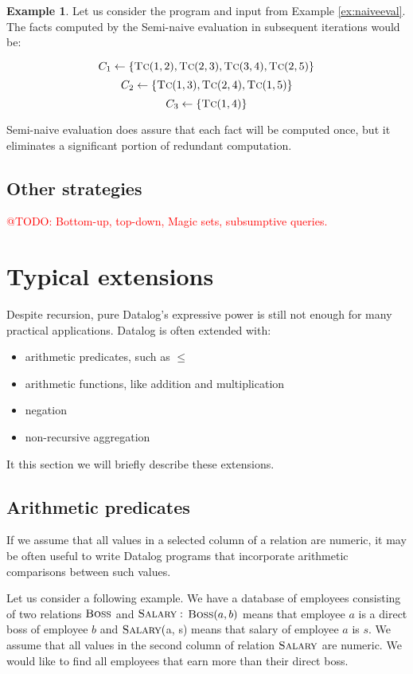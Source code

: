 \documentclass{pracamgr}
\makeatletter
\theoremstyle{plain}
\theoremstyle{definition}
\newtheorem{exmp}{Example}[section]
\theoremstyle{remark}
\newcommand{\todo}[1]{\textcolor{red}{@TODO: #1}}
\newcommand{\relat}[2]{$\textsc{#1}#2$}
\makeatother
\begin{document}
\begin{exmp}
Let us consider the program and input from Example \ref{ex:naiveeval}. The facts computed by the Semi-naive evaluation in subsequent iterations would be:

$$C_1 \leftarrow \{\textsc{Tc}(1, 2), \textsc{Tc}(2, 3), \textsc{Tc}(3, 4), \textsc{Tc}(2, 5)\}$$
$$C_2 \leftarrow \{\textsc{Tc}(1, 3), \textsc{Tc}(2, 4), \textsc{Tc}(1, 5)\}$$
$$C_3 \leftarrow \{\textsc{Tc}(1, 4)\}$$
\end{exmp}\label{ex:naiveeval}

Semi-naive evaluation does assure that each fact will be computed once, but it eliminates a significant portion of redundant computation.

\subsection{Other strategies}
\todo{Bottom-up, top-down, Magic sets, subsumptive queries.}

\section{Typical extensions}
Despite recursion, pure Datalog's expressive power is still not enough for many practical applications. Datalog is often extended with:
\begin{itemize}
\item arithmetic predicates, such as $\le$
\item arithmetic functions, like addition and multiplication
\item negation
\item non-recursive aggregation
\end{itemize}

It this section we will briefly describe these extensions.

\subsection{Arithmetic predicates}
If we assume that all values in a selected column of a relation are numeric, it may be often useful to write Datalog programs that incorporate arithmetic comparisons between such values.

Let us consider a following example. We have a database of employees consisting of two relations \relat{Boss}{} and \relat{Salary}: \relat{Boss}{(a, b)} means that employee $a$ is a direct boss of employee $b$ and \relat{Salary}(a, s) means that salary of employee $a$ is $s$. We assume that all values in the second column of relation \relat{Salary}{} are numeric. We would like to find all employees that earn more than their direct boss.
\end{document}
